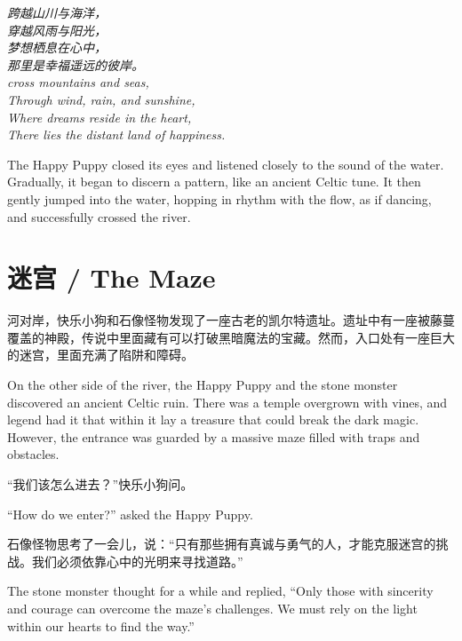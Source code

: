 \begin{center}
    \textit{
    跨越山川与海洋，\\
    穿越风雨与阳光，\\
    梦想栖息在心中，\\
    那里是幸福遥远的彼岸。 \\
    cross mountains and seas,\\
    Through wind, rain, and sunshine,\\
    Where dreams reside in the heart,\\
    There lies the distant land of happiness.
    }
    \end{center}

\begin{flushright}
The Happy Puppy closed its eyes and listened closely to the sound of the water. Gradually, it began to discern a pattern, like an ancient Celtic tune. It then gently jumped into the water, hopping in rhythm with the flow, as if dancing, and successfully crossed the river.
\end{flushright}

\section*{迷宫 / The Maze}

河对岸，快乐小狗和石像怪物发现了一座古老的凯尔特遗址。遗址中有一座被藤蔓覆盖的神殿，传说中里面藏有可以打破黑暗魔法的宝藏。然而，入口处有一座巨大的迷宫，里面充满了陷阱和障碍。

\begin{flushright}
On the other side of the river, the Happy Puppy and the stone monster discovered an ancient Celtic ruin. There was a temple overgrown with vines, and legend had it that within it lay a treasure that could break the dark magic. However, the entrance was guarded by a massive maze filled with traps and obstacles.
\end{flushright}

“我们该怎么进去？”快乐小狗问。

\begin{flushright}
“How do we enter?” asked the Happy Puppy.
\end{flushright}

石像怪物思考了一会儿，说：“只有那些拥有真诚与勇气的人，才能克服迷宫的挑战。我们必须依靠心中的光明来寻找道路。”

\begin{flushright}
The stone monster thought for a while and replied, “Only those with sincerity and courage can overcome the maze’s challenges. We must rely on the light within our hearts to find the way.”
\end{flushright}

